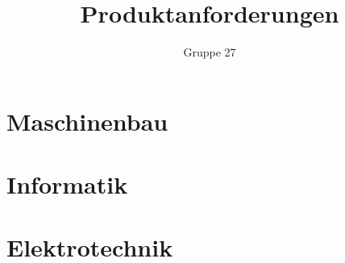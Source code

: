 \documentclass[a4paper,10pt,fleqn]{article}
\title{Produktanforderungen}
\author{Gruppe 27}
\begin{document}
\maketitle
\clearpage
\tableofcontents
\clearpage



\section{Maschinenbau}

\section{Informatik}

\section{Elektrotechnik}
\end{document}

